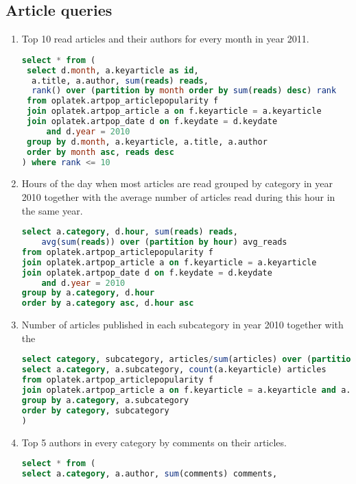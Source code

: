 \subsection*{Article queries} %
\label{sub:Article  queries}
\begin{enumerate}
\item    Top 10 read articles and their authors for every month in year 2011.
\begin{lstlisting}[language=sql] 
select * from (
 select d.month, a.keyarticle as id, 
  a.title, a.author, sum(reads) reads, 
  rank() over (partition by month order by sum(reads) desc) rank 
 from oplatek.artpop_articlepopularity f
 join oplatek.artpop_article a on f.keyarticle = a.keyarticle
 join oplatek.artpop_date d on f.keydate = d.keydate 
     and d.year = 2010
 group by d.month, a.keyarticle, a.title, a.author
 order by month asc, reads desc
) where rank <= 10
\end{lstlisting}
\item    Hours of the day when most articles are read grouped by category in year 2010 together with the average number of articles read during this hour in the same year.
\begin{lstlisting}[language=sql] 
select a.category, d.hour, sum(reads) reads, 
    avg(sum(reads)) over (partition by hour) avg_reads 
from oplatek.artpop_articlepopularity f
join oplatek.artpop_article a on f.keyarticle = a.keyarticle
join oplatek.artpop_date d on f.keydate = d.keydate 
    and d.year = 2010
group by a.category, d.hour
order by a.category asc, d.hour asc
\end{lstlisting}
\item    Number of articles published in each subcategory in year 2010 together with the %
\begin{lstlisting}[language=sql] 
select category, subcategory, articles/sum(articles) over (partition by category) perct, articles, sum(articles) over (partition by category) as articles_in_category from (
select a.category, a.subcategory, count(a.keyarticle) articles
from oplatek.artpop_articlepopularity f
join oplatek.artpop_article a on f.keyarticle = a.keyarticle and a.publicationyear = 2011
group by a.category, a.subcategory
order by category, subcategory
)
\end{lstlisting}
\item    Top 5 authors in every category by comments on their articles.
\begin{lstlisting}[language=sql] 
select * from (
select a.category, a.author, sum(comments) comments, 

\end{lstlisting}
\end{enumerate}
